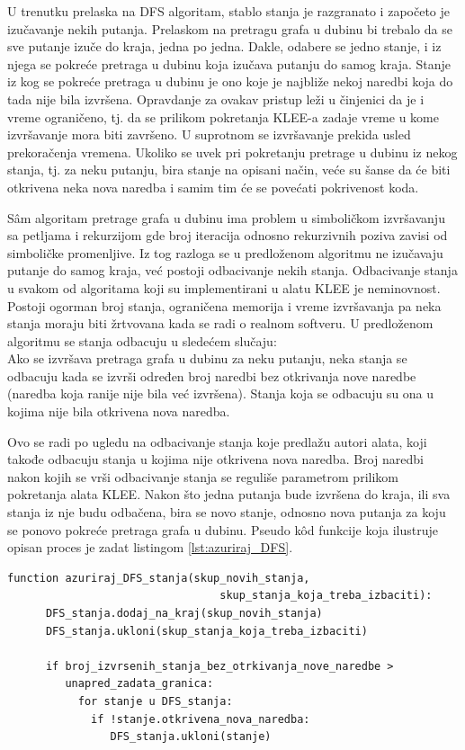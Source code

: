 \documentclass[12pt,oneside]{memoir}
\begin{document}
U trenutku prelaska na DFS algoritam, stablo stanja je razgranato i započeto je izučavanje nekih putanja. Prelaskom na pretragu grafa u dubinu bi trebalo da se sve putanje izuče do kraja, jedna po jedna. Dakle, odabere se jedno stanje, i iz njega se pokreće pretraga u dubinu koja izučava putanju do samog kraja. Stanje iz kog se pokreće pretraga u dubinu je ono koje je najbliže nekoj naredbi koja do tada nije bila izvršena. Opravdanje za ovakav pristup leži u činjenici da je i vreme ograničeno, tj. da se prilikom pokretanja KLEE-a zadaje vreme u kome izvršavanje mora biti završeno. U suprotnom se izvršavanje prekida usled prekoračenja vremena. Ukoliko se uvek pri pokretanju pretrage u dubinu iz nekog stanja, tj. za neku putanju, bira stanje na opisani način, veće su šanse da će biti otkrivena neka nova naredba i samim tim će se povećati pokrivenost koda. 

S\^am algoritam pretrage grafa u dubinu ima problem u simboličkom izvršavanju sa petljama i rekurzijom gde broj iteracija odnosno rekurzivnih poziva zavisi od simboličke promenljive. Iz tog razloga se u predloženom algoritmu ne izučavaju putanje do samog kraja, već postoji odbacivanje nekih stanja. Odbacivanje stanja u svakom od algoritama koji su implementirani u alatu KLEE je neminovnost. Postoji ogorman broj stanja, ograničena memorija i vreme izvršavanja pa neka stanja moraju biti žrtvovana kada se radi o realnom softveru. U predloženom algoritmu se stanja odbacuju u sledećem slučaju: \\
Ako se izvršava pretraga grafa u dubinu za neku putanju, neka stanja se odbacuju kada se izvrši određen broj naredbi bez otkrivanja nove naredbe (naredba koja ranije nije bila već izvršena). Stanja koja se odbacuju su ona u kojima nije bila otkrivena nova naredba.


Ovo se radi po ugledu na odbacivanje stanja koje predlažu autori alata, koji takođe odbacuju stanja u kojima nije otkrivena nova naredba. Broj naredbi nakon kojih se vrši odbacivanje stanja se reguliše parametrom prilikom pokretanja alata KLEE. Nakon što jedna putanja bude izvršena do kraja, ili sva stanja iz nje budu odbačena, bira se novo stanje, odnosno nova putanja za koju se ponovo pokreće pretraga grafa u dubinu. Pseudo k\^od funkcije koja ilustruje opisan proces je zadat listingom \ref{lst:azuriraj_DFS}.

    \begin{lstlisting}[caption={Pseudo k\^od funkcije za ažuriranje DFS stanja},captionpos=b,label={lst:azuriraj_DFS}]
    function azuriraj_DFS_stanja(skup_novih_stanja, 
                                 skup_stanja_koja_treba_izbaciti):
      DFS_stanja.dodaj_na_kraj(skup_novih_stanja)
      DFS_stanja.ukloni(skup_stanja_koja_treba_izbaciti)        
            
      if broj_izvrsenih_stanja_bez_otrkivanja_nove_naredbe > 
         unapred_zadata_granica:
           for stanje u DFS_stanja:
             if !stanje.otkrivena_nova_naredba:
                DFS_stanja.ukloni(stanje)
    \end{lstlisting}
\end{document}
